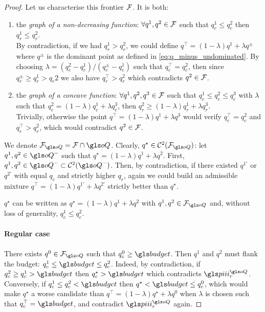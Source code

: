 \begin{subappendices}
\begin{proof}
    Let us characterise this frontier $\mathcal{F}$. It is both:
    \begin{enumerate}
        \item the \emph{graph of a non-decreasing function}: $\forall q^1, q^2\in\mathcal{F}$ such that $q_c^1\leq q_c^2$ then $q_r^1\leq q_r^2$.\\
        By contradiction, if we had $q_r^1 > q_r^2$, we could define $q^\top = (1-\lambda)q^1 + \lambda q^\pm$ where $q^\pm$ is the dominant point as defined in \eqref{eq:q_minus_undominated}. By choosing $\lambda=(q^2_c-q^1_c)/(q^\pm_c-q^1_c)$ such that $q^\top_c = q_c^2$, then since $q_r^\pm \geq q_r^1 > q_r 2$ we also have $q^\top_r > q_r^2$ which contradicts $q^2\in\mathcal{F}$.
        \item the \emph{graph of a concave function}: $\forall q^1, q^2, q^3\in\mathcal{F}$ such that $q_c^1\leq q_c^2 \leq q_c^3$ with $\lambda$ such that $q^2_c = (1-\lambda)q^1_c + \lambda q^3_c$, then $q_r^2 \geq (1-\lambda)q_r^1 + \lambda q_r^3$.\\
        Trivially, otherwise the point $q^\top = (1-\lambda)q^1 + \lambda q^3$ would verify $q^\top_c=q^2_c$ and $q^\top_r > q^2_r$, which would contradict $q^2 \in\mathcal{F}$.
    \end{enumerate}

    We denote $\cF_{\oQ} = \cF \cap \oQ$. Clearly, $q^{\star}\in\cC^2(\cF_{\oQ})$: let $q^1, q^2\in \oQ^-$ such that $q^{\star} = (1-\lambda)q^1 + \lambda q^2$. First, $q^1, q^2\in \oQ^-\subset\cC^2(\oQ^-)$. Then, by contradiction, if there existed $q^{1'}$ or $q^{2'}$ with equal $q_c$ and strictly higher $q_r$, again we could build an admissible mixture $q^{\top}=(1-\lambda)q^{1'}  + \lambda q^{2'}$ strictly better than $q^{\star}$.

    $q^{\star}$ can be written as $q^{\star} = (1-\lambda)q^1 + \lambda q^2$ with $q^1, q^2\in\cF_{\oQ}$ and, without loss of generality, $q^1_c \leq q^2_c$.

    \paragraph{Regular case}

    There exists $q^0\in\cF_{\oQ}$ such that $q^0_c \geq \budget$. Then $q^1$ and $q^2$ must flank the budget: $q_c^1 \leq \budget \leq q_c^2$. Indeed, by contradiction, if $q_c^2 \geq q_c^1 > \budget$ then $q_c^{\star} > \budget$ which contradicts $\policies_r^{\oQ}$. Conversely, if $q_c^1 \leq q_c^2 < \budget$ then $q^{\star} < \budget \leq q^0_c$, which would make $q^{\star}$ a worse candidate than $q^\top=(1-\lambda)q^{\star} + \lambda q^0$ when $\lambda$ is chosen such that $q_c^\top=\budget$, and contradict $\policies_r^{\oQ}$ again.


\end{proof}
\end{subappendices}
